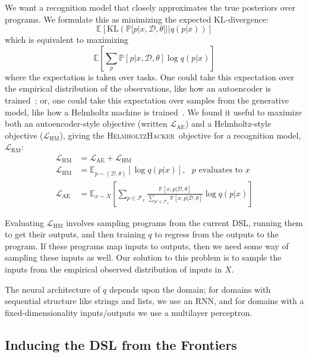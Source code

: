 \documentclass{article}
\newcommand{\system}{\textsc{HelmholtzHacker}~}
\newcommand{\expect}{\mathds{E}} %
\newcommand{\probability}{\mathds{P}} %
\begin{document}
We want a recognition model that closely approximates the true posteriors over programs. We formulate this as minimizing the expected KL-divergence:
\begin{equation*}
  \expect\left[\text{KL}\left(\probability[p|x,\mathcal{D},\theta]||q(p|x) \right) \right]
\end{equation*}
which is equivalent to maximizing
\begin{equation*}
  \expect\left[\sum_p\probability[p|x,\mathcal{D},\theta]\log q(p|x) \right]
\end{equation*}
where the expectation is taken over tasks. One could take this expectation
over the empirical distribution of the observations,
like how an autoencoder is trained~\cite{hinton2006reducing}; or, one could take this expectation over samples from the generative model, like how a Helmholtz machine is trained~\cite{dayan1995helmholtz}.
We found it useful to maximize both an autoencoder-style objective (written $\mathcal{L}_{\text{AE}}$) and a Helmholtz-style objective ($\mathcal{L}_{\text{HM}}$), giving the \system objective for a recognition model, $\mathcal{L}_{\text{RM}}$:
\begin{align}
\mathcal{L}_{\text{RM}}& = \mathcal{L}_\text{AE} + \mathcal{L}_\text{HM}\\
\mathcal{L}_{\text{HM}}& = \expect_{p\sim(\mathcal{D},\theta) }\left[\log q(p|x)\right],\text{ $p$ evaluates to $x$}\nonumber\\
\mathcal{L}_{\text{AE}}& = \expect_{x\sim X}\left[\sum_{p\in \mathcal{F}_x}
  \frac{\probability\left[x,p|\mathcal{D},\theta \right]}{\sum_{p'\in \mathcal{F}_x}\probability\left[x,p|\mathcal{D},\theta \right]}\log q(p|x)\right]\nonumber
\end{align}

Evaluating $\mathcal{L}_{\text{HM}}$ involves sampling programs from
the current DSL, running them to get their outputs,
and then training $q$ to regress from the outputs to the program.
If these programs map inputs to outputs,
then we need some way of sampling these inputs as well.
Our solution to this problem is to sample the inputs
from the empirical observed distribution of inputs in $X$.

The neural architecture of $q$ depends upon the domain;
for domains with sequential structure like strings and lists,
we use an RNN,
and for domains with a fixed-dimensionality inputs/outputs we use a multilayer perceptron.

\subsection{Inducing the DSL from the Frontiers}\label{grammarInductionSection}
\end{document}

